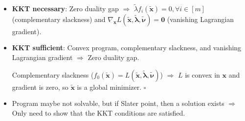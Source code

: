 \documentclass[8pt,a4paper]{extarticle}
\renewcommand{\proof}[1]{\begin{tcolorbox}#1 \hfill $\square$\end{tcolorbox}}
\renewcommand{\vec}[1]{\bm{#1}}
\newenvironment{topic}[1]
{\textbf{\sffamily \colorbox{black}{\rlap{\textbf{\textcolor{white}{#1}}}\hspace{\linewidth}\hspace{-2\fboxsep}}} \\ \vspace{0.2cm}}
{}
\begin{document}
\begin{multicols*}{2}
\begin{topic}{Non-linear programming}
\begin{itemize}
            \item \textbf{KKT necessary}: Zero duality gap $\Rightarrow$ $\tilde{\lambda} f_i(\tilde{\vec{x}}) = 0, \forall i \in [m]$ (complementary slackness) and $\nabla_{\vec{x}} L(\tilde{\vec{x}}, \tilde{\vec{\lambda}}, \tilde{\vec{\nu}}) = \vec{0}$ (vanishing Lagrangian gradient).
            \item \textbf{KKT sufficient}: Convex program, complementary slackness, and vanishing Lagrangian gradient $\Rightarrow$ Zero duality gap.
                  \proof{Complementary slackness ($f_0(\tilde{\vec{x}}) = L(\tilde{\vec{x}},
                          \tilde{\vec{\lambda}}, \tilde{\vec{\nu}})$) $\Rightarrow$ $L$ is convex in $\vec{x}$
                      and gradient is zero, so $\tilde{\vec{x}}$ is a global minimizer.}
            \item Program maybe not solvable, but if Slater point, then a solution exists $\Rightarrow$ Only need to
                  show that the KKT conditions are satisfied.
        \end{itemize}
    \end{topic}


\end{multicols*}
\end{document}
